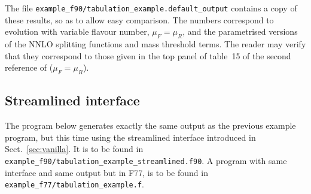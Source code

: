 \documentclass[12pt]{article}
\newcommand{\ttt}[1]{\texttt{#1}}
\begin{document}
\noindent The file
\ttt{example\_f90/tabulation\_example.default\_output} contains a copy
of these results, so as to allow easy comparison. The numbers
correspond to evolution with variable flavour number, $\mu_F = \mu_R$,
and the parametrised versions of the NNLO splitting functions and mass
threshold terms.
%
The reader may verify that they correspond to those given in the top
panel of table~15 of the second reference of \cite{Benchmarks} ($\mu_F
= \mu_R$).

\subsection{Streamlined interface}

The program below generates exactly the same output
as the previous example program, but this time
using the streamlined interface introduced
in Sect.~\ref{sec:vanilla}. It is to be
found in
\ttt{example\_f90/tabulation\_example\_streamlined.f90}. 
A program with same interface and same output 
but in F77, is to be found in
\ttt{example\_f77/tabulation\_example.f}.
\end{document}
